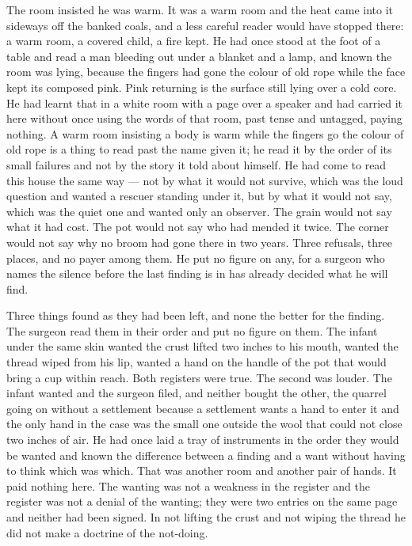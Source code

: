 The room insisted he was warm. It was a warm room and the heat came into it sideways off the banked coals, and a less careful reader would have stopped there: a warm room, a covered child, a fire kept. He had once stood at the foot of a table and read a man bleeding out under a blanket and a lamp, and known the room was lying, because the fingers had gone the colour of old rope while the face kept its composed pink. Pink returning is the surface still lying over a cold core. He had learnt that in a white room with a page over a speaker and had carried it here without once using the words of that room, past tense and untagged, paying nothing. A warm room insisting a body is warm while the fingers go the colour of old rope is a thing to read past the name given it; he read it by the order of its small failures and not by the story it told about himself. He had come to read this house the same way --- not by what it would not survive, which was the loud question and wanted a rescuer standing under it, but by what it would not say, which was the quiet one and wanted only an observer. The grain would not say what it had cost. The pot would not say who had mended it twice. The corner would not say why no broom had gone there in two years. Three refusals, three places, and no payer among them. He put no figure on any, for a surgeon who names the silence before the last finding is in has already decided what he will find.

Three things found as they had been left, and none the better for the finding. The surgeon read them in their order and put no figure on them. The infant under the same skin wanted the crust lifted two inches to his mouth, wanted the thread wiped from his lip, wanted a hand on the handle of the pot that would bring a cup within reach. Both registers were true. The second was louder. The infant wanted and the surgeon filed, and neither bought the other, the quarrel going on without a settlement because a settlement wants a hand to enter it and the only hand in the case was the small one outside the wool that could not close two inches of air. He had once laid a tray of instruments in the order they would be wanted and known the difference between a finding and a want without having to think which was which. That was another room and another pair of hands. It paid nothing here. The wanting was not a weakness in the register and the register was not a denial of the wanting; they were two entries on the same page and neither had been signed. In not lifting the crust and not wiping the thread he did not make a doctrine of the not-doing.

